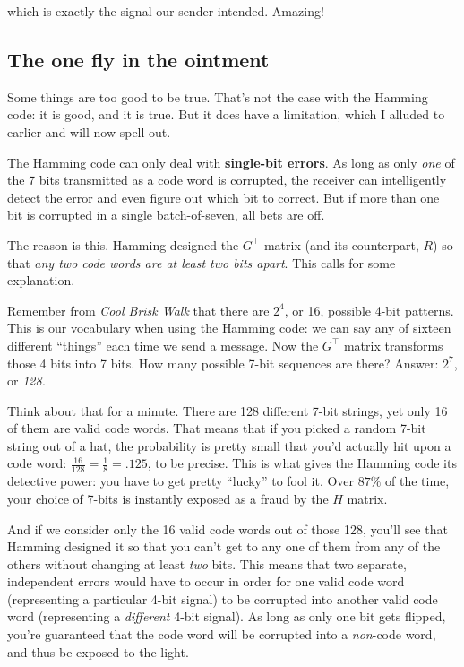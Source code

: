 which is exactly the signal our sender intended. Amazing!

\subsection{The one fly in the ointment}

Some things are too good to be true. That's not the case with the Hamming code:
it is good, and it is true. But it does have a limitation, which I alluded to
earlier and will now spell out.


The Hamming code can only deal with \textbf{single-bit errors}. As long as only
\textit{one} of the 7 bits transmitted as a code word is corrupted, the
receiver can intelligently detect the error and even figure out which bit to
correct. But if more than one bit is corrupted in a single batch-of-seven, all
bets are off.

The reason is this. Hamming designed the $G^\intercal$ matrix (and its
counterpart, $R$) so that \textit{any two code words are at least two bits
apart}. This calls for some explanation.

Remember from \textit{Cool Brisk Walk} that there are $2^{4}$, or 16, possible
4-bit patterns. This is our vocabulary when using the Hamming code: we can say
any of sixteen different ``things'' each time we send a message. Now the
$G^\intercal$ matrix transforms those 4 bits into 7 bits. How many possible
7-bit sequences are there? Answer: $2^7$, or \textit{128.}

Think about that for a minute. There are 128 different 7-bit strings, yet only
16 of them are valid code words. That means that if you picked a random 7-bit
string out of a hat, the probability is pretty small that you'd actually hit
upon a code word: $\frac{16}{128} = \frac{1}{8} = .125$, to be precise. This is
what gives the Hamming code its detective power: you have to get pretty
``lucky'' to fool it. Over $87\%$ of the time, your choice of 7-bits is
instantly exposed as a fraud by the $H$ matrix.

And if we consider only the 16 valid code words out of those 128, you'll see
that Hamming designed it so that you can't get to any one of them from any of
the others without changing at least \textit{two} bits. This means that two
separate, independent errors would have to occur in order for one valid code
word (representing a particular 4-bit signal) to be corrupted into another
valid code word (representing a \textit{different} 4-bit signal). As long as
only one bit gets flipped, you're guaranteed that the code word will be
corrupted into a \textit{non}-code word, and thus be exposed to the light.

